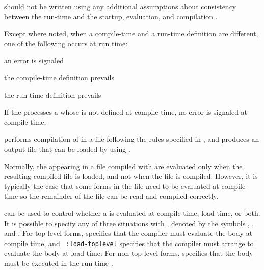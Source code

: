 \endlist 

 should not be written using any additional
assumptions about consistency between the run-time 
 and the startup, evaluation, and compilation 
.

Except where noted, when a compile-time and a run-time definition are
different, one of the following occurs at run time:

\beginlist
                                                          
\item{\bull} an error  is signaled
\item{\bull} the compile-time definition prevails
\item{\bull} the run-time definition prevails

\endlist
 
If the  processes a  whose  
is not defined at compile time, no error is signaled at compile time.

\endsubsubsection%
\endsubSection%
 
 performs compilation of 
 in a file following the rules specified in \secref\CompilationSemantics,
and produces an output file that can be loaded by using .
 
Normally, the  appearing in a file compiled with
 are evaluated only when the resulting
compiled file is loaded, and not when the file is compiled.  However,
it is typically the case that some forms in the file need to be evaluated
at compile time so the
remainder of the file can be read and compiled correctly.

 can be used to control
whether a  is evaluated at compile time, load
time, or both.  It is possible to specify any of three situations with
, denoted by the symbols ,
, and .  For top level 
 forms,  specifies that the
compiler must evaluate the body at compile time, and {\tt
:load-toplevel} specifies that the compiler must arrange to evaluate
the body at load time. For non-top level  forms,
 specifies that the body must be executed in the run-time
.

